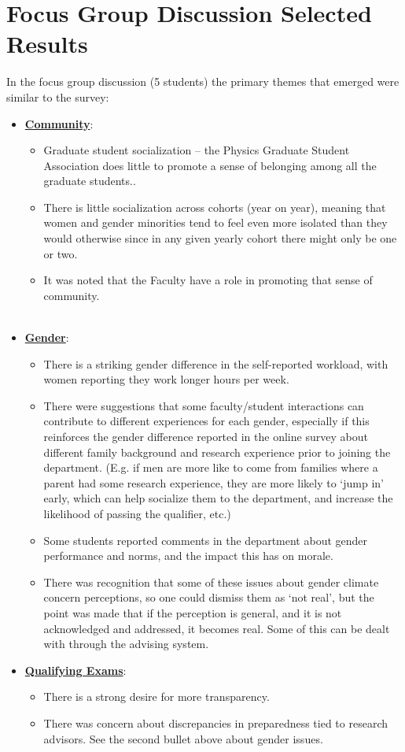 \documentclass[oneside]{book}   %
\begin{document}
\section{Focus Group Discussion Selected Results}
\label{sec:focus_group}
In the focus group discussion (5 students) the primary themes that emerged were similar to the survey:

\begin{itemize}
	\item \underline{\textbf{Community}}:
		\begin{itemize}
			\item Graduate student socialization – the Physics Graduate Student Association does little to promote a sense of belonging among all the graduate students..
			\item There is little socialization across cohorts (year on year), meaning that women and gender minorities tend to feel even more isolated than they would otherwise since in any given yearly cohort there might only be one or two.
			\item It was noted that the Faculty have a role in promoting that sense of community.\\ \\
		\end{itemize}
	\item \underline{\textbf{Gender}}:
		\begin{itemize}
			\item There is a striking gender difference in the self-reported workload, with women reporting they work longer hours per week. 
			\item There were suggestions that some faculty/student interactions can contribute to different experiences for each gender, especially if this reinforces the gender difference reported in the online survey about different family background and research experience prior to joining the department. (E.g. if men are more like to come from families where a parent had some research experience, they are more likely to `jump in’ early, which can help socialize them to the department, and increase the likelihood of passing the qualifier, etc.)
			\item Some students reported comments in the department about gender performance and norms, and the impact this has on morale.
			\item There was recognition that some of these issues about gender climate concern perceptions, so one could dismiss them as `not real’, but the point was made that if the perception is general, and it is not acknowledged and addressed, it becomes real.  Some of this can be dealt with through the advising system.
		\end{itemize}
	\item \underline{\textbf{Qualifying Exams}}:
		\begin{itemize}
			\item There is a strong desire for more transparency.
			\item There was concern about discrepancies in preparedness tied to research advisors. See the second bullet above about gender issues.
		\end{itemize}
\end{itemize}
\end{document}
